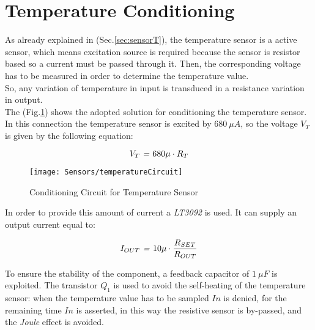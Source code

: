 \newpage
\clearpage

\section{Temperature Conditioning}\label{tempcon}



As already explained in (Sec.\ref{sec:sensorT}), the temperature sensor is a active sensor, which means excitation source is required because the sensor is resistor based so a current must be passed through it. Then, the corresponding voltage has to be measured in order to determine the temperature value.\\
So, any variation of temperature in input is transduced in a resistance variation in output.\\

The (Fig.\ref{Fig:temperatureCircuit}) shows the adopted solution for conditioning the temperature sensor.\\
In this connection the temperature sensor is excited by $680\ \mu A$, so the voltage $V_T$ is given by the following equation:

\begin{equation}
V_T \text{ \textit{=} } 680 \mu \cdot R_T
\end{equation}

\begin{figure}[h]
	\begin{center}
		\texttt{[image: Sensors/temperatureCircuit]}
		\caption{Conditioning Circuit for Temperature Sensor}
		\label{Fig:temperatureCircuit}
	\end{center}
\end{figure}

In order to provide this amount of current a \textit{LT3092} is used. It can supply an output current equal to:

\begin{equation}
I_{OUT} \text{\textit{ = }} 10\mu \cdot \frac{R_{SET}}{R_{OUT}}
\end{equation}

To ensure the stability of the component, a feedback capacitor of $1\ \mu F$ is exploited. The transistor $Q_1$ is used to avoid the self-heating of the temperature sensor: when the temperature value has to be sampled $In$ is denied, for the remaining time $In$ is asserted, in this way the resistive sensor is by-passed, and the \textit{Joule} effect is avoided.\\

